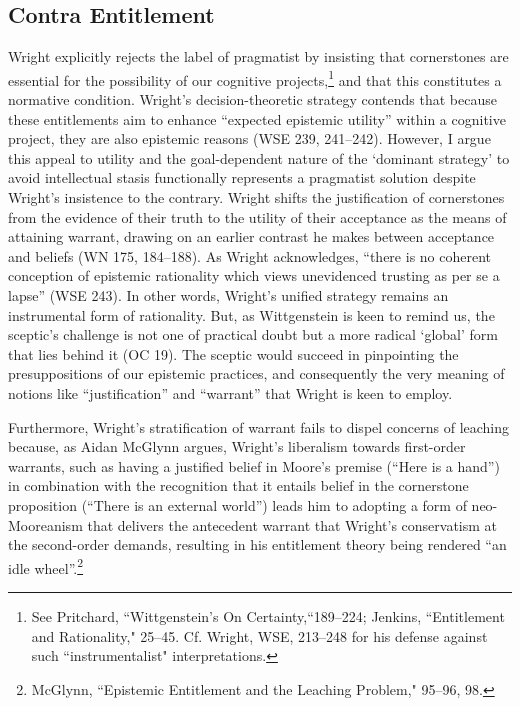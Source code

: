 \subsection{Contra Entitlement}

Wright explicitly rejects the label of pragmatist by insisting that
cornerstones are essential for the possibility of our cognitive
projects,\footnote{See Pritchard, ``Wittgenstein's On
  Certainty,``189--224; Jenkins, ``Entitlement and Rationality," 25--45.
  Cf. Wright, WSE, 213--248 for his defense against such ``instrumentalist" interpretations.} and that this constitutes a
normative condition. Wright's decision-theoretic strategy contends that
because these entitlements aim to enhance ``expected epistemic utility''
within a cognitive project, they are also epistemic reasons (WSE 239,
241--242). However, I argue this appeal to utility and the goal-dependent
nature of the `dominant strategy' to avoid intellectual stasis
functionally represents a pragmatist solution despite Wright's
insistence to the contrary. Wright shifts the justification of
cornerstones from the evidence of their truth to the utility of their
acceptance as the means of attaining warrant, drawing on an earlier
contrast he makes between acceptance and beliefs (WN 175, 184--188). As
Wright acknowledges, ``there is no coherent conception of epistemic
rationality which views unevidenced trusting as per se a lapse'' (WSE
243). In other words, Wright's unified strategy remains an instrumental
form of rationality. But, as Wittgenstein is keen to remind us, the
sceptic's challenge is not one of practical doubt but a more radical
`global' form that lies behind it (OC 19). The sceptic would succeed in
pinpointing the presuppositions of our epistemic practices, and
consequently the very meaning of notions like ``justification'' and
``warrant'' that Wright is keen to employ.

Furthermore, Wright's stratification of warrant fails to dispel concerns
of leaching because, as Aidan McGlynn argues, Wright's liberalism
towards first-order warrants, such as having a justified belief in
Moore's premise (``Here is a hand'') in combination with the recognition
that it entails belief in the cornerstone proposition (``There is an
external world'') leads him to adopting a form of neo-Mooreanism that
delivers the antecedent warrant that Wright's conservatism at the
second-order demands, resulting in his entitlement theory being rendered
``an idle wheel''.\footnote{McGlynn, ``Epistemic Entitlement and the
  Leaching Problem," 95--96, 98.}

